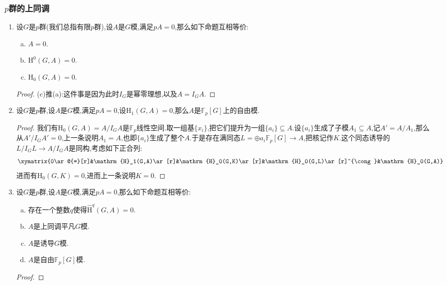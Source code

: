 \subsubsection{$p$群的上同调}
\begin{enumerate}
	\item 设$G$是$p$群(我们总指有限$p$群),设$A$是$G$模,满足$pA=0$,那么如下命题互相等价:
	\begin{enumerate}[(a)]
		\item $A=0$.
		\item $\mathrm{H}^0(G,A)=0$.
		\item $\mathrm{H}_0(G,A)=0$.
	\end{enumerate}
	\begin{proof}
		
		(c)推(a):这件事是因为此时$I_G$是幂零理想,以及$A=I_GA$.
	\end{proof}
	\item 设$G$是$p$群,设$A$是$G$模,满足$pA=0$,设$\mathrm{H}_1(G,A)=0$,那么$A$是$\mathbb{F}_p[G]$上的自由模.
	\begin{proof}
		
		我们有$\mathrm{H}_0(G,A)=A/I_GA$是$\mathbb{F}_p$线性空间.取一组基$\{x_i\}$,把它们提升为一组$\{a_i\}\subseteq A$.设$\{a_i\}$生成了子模$A_1\subseteq A$,记$A'=A/A_1$,那么从$A'/I_GA'=0$,上一条说明$A_1=A$,也即$\{a_i\}$生成了整个$A$.于是存在满同态$L=\oplus a_i\mathbb{F}_p[G]\to A$,把核记作$K$.这个同态诱导的$L/I_GL\to A/I_GA$是同构,考虑如下正合列:
		$$\xymatrix{0\ar@{=}[r]&\mathrm{H}_1(G,A)\ar[r]&\mathrm{H}_0(G,K)\ar[r]&\mathrm{H}_0(G,L)\ar[r]^{\cong}&\mathrm{H}_0(G,A)}$$
		进而有$\mathrm{H}_0(G,K)=0$,进而上一条说明$K=0$.
	\end{proof}
	\item 设$G$是$p$群,设$A$是$G$模,满足$pA=0$,那么如下命题互相等价:
	\begin{enumerate}[(a)]
		\item 存在一个整数$q$使得$\widehat{\mathrm{H}}^q(G,A)=0$.
		\item $A$是上同调平凡$G$模.
		\item $A$是诱导$G$模.
		\item $A$是自由$\mathbb{F}_p[G]$模.
	\end{enumerate}
	\begin{proof}
		

\end{proof}
\end{enumerate}
